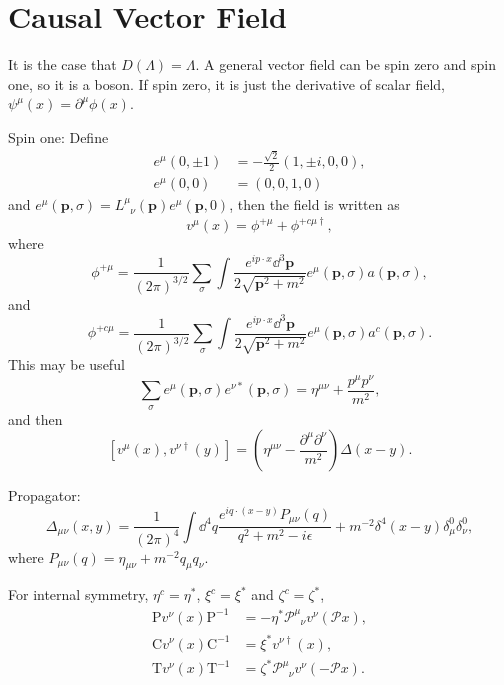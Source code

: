 \documentclass[9pt]{extbook}
\begin{document}
\section{Causal Vector Field}
It is the case that $D(\Lambda)=\Lambda$. A general vector field can be spin zero and spin one, so it is a boson. If spin zero, it is just the derivative of scalar field, $\psi^\mu(x)=\partial^\mu \phi(x)$.

Spin one: Define
\[
\begin{split}
	e^\mu(0,\pm 1)&=-\frac{\sqrt{2}}{2}(1,\pm i,0,0),\\
	e^\mu(0,0)&=(0,0,1,0)
\end{split}
\]
and $e^\mu(\bm{p},\sigma)=L^\mu_{\phantom{\mu}\nu}(\bm{p})e^\mu(\bm{p},0)$, then the field is written as 
\[
	v^\mu(x)=\phi^{+\mu}+\phi^{+c\mu\dag},
\]
where
\[
	\phi^{+\mu}=\frac{1}{(2\pi)^{3/2}}\sum_{\sigma}\int \frac{e^{ip\cdot x}\dd^3\bm{p}}{2\sqrt{\bm{p}^2+m^2}}e^\mu(\bm{p},\sigma)a(\bm{p},\sigma),
\]
and
\[
	\phi^{+c\mu}=\frac{1}{(2\pi)^{3/2}}\sum_{\sigma}\int \frac{e^{ip\cdot x}\dd^3\bm{p}}{2\sqrt{\bm{p}^2+m^2}}e^\mu(\bm{p},\sigma)a^c(\bm{p},\sigma).
\]
This may be useful
\[
	\sum_{\sigma} e^\mu(\bm{p},\sigma)e^{\nu*}(\bm{p},\sigma)=\eta^{\mu\nu}+\frac{p^\mu p^\nu}{m^2},
\]
and then
\[
	[v^\mu(x),v^{\nu\dag}(y)]=\left(\eta^{\mu\nu}-\frac{\partial^\mu \partial^\nu}{m^2}\right)\Delta(x-y).
\]

Propagator:
\[
	\Delta_{\mu\nu}(x,y)=\frac{1}{(2\pi)^4}\int \dd^4q \frac{e^{iq\cdot (x-y)}P_{\mu\nu}(q)}{q^2+m^2-i\epsilon}+m^{-2}\delta^4(x-y)\delta^0_\mu \delta^0_\nu,
\]
where $P_{\mu\nu}(q)=\eta_{\mu\nu}+m^{-2}q_\mu q_\nu$.

For internal symmetry, $\eta^c=\eta^*$, $\xi^c=\xi^*$ and $\zeta^c=\zeta^*$,
\[
\begin{split}
	\mathrm{P}v^\nu(x)\mathrm{P}^{-1}&=-\eta^*\mathscr{P}^\mu_{\phantom{\mu}\nu}v^\nu(\mathscr{P}x),\\
	\mathrm{C}v^\nu(x)\mathrm{C}^{-1}&=\xi^*v^{\nu\dag}(x),\\
	\mathrm{T}v^\nu(x)\mathrm{T}^{-1}&=\zeta^*\mathscr{P}^\mu_{\phantom{\mu}\nu}v^\nu(-\mathscr{P}x).
\end{split}
\]
\end{document}
